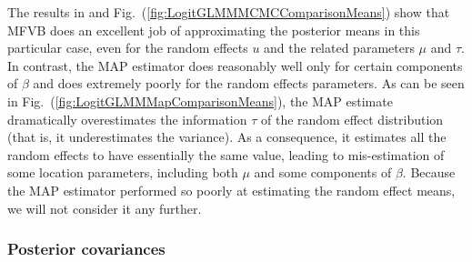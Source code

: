 \documentclass{article}\usepackage[]{graphicx}\usepackage[]{color}
\theoremstyle{plain}
\theoremstyle{definition}
\theoremstyle{plain}
\theoremstyle{plain}
\theoremstyle{plain}
\theoremstyle{plain}
\newcommand{\fig}[1]{Fig.~(\ref{fig:#1})}
\begin{document}
The results in  and \fig{LogitGLMMMCMCComparisonMeans}
show that MFVB does an excellent job of approximating the posterior
means in this particular case, even for the random effects $u$ and
the related parameters $\mu$ and $\tau$. In contrast, the MAP estimator
does reasonably well only for certain components of $\beta$ and does
extremely poorly for the random effects parameters. As can be seen
in \fig{LogitGLMMMapComparisonMeans}, the MAP estimate dramatically
overestimates the information $\tau$ of the random effect distribution
(that is, it underestimates the variance). As a consequence, it estimates
all the random effects to have essentially the same value, leading
to mis-estimation of some location parameters, including both $\mu$
and some components of $\beta$. Because the MAP estimator performed
so poorly at estimating the random effect means, we will not consider
it any further.

\subsubsection{Posterior covariances}
\end{document}
